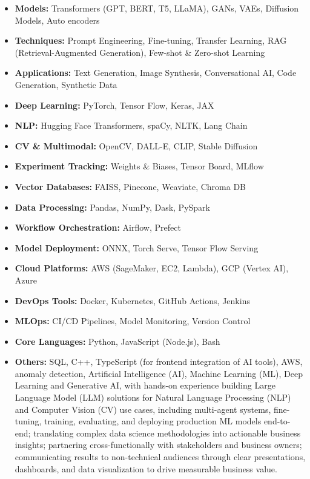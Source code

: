 \documentclass[11pt,letterpaper]{article}
\begin{document}
\begin{itemize}
  \item \textbf{Models:} Transformers (GPT, BERT, T5, LLaMA), GANs, VAEs, Diffusion Models, Auto encoders
  \item \textbf{Techniques:} Prompt Engineering, Fine-tuning, Transfer Learning, RAG (Retrieval-Augmented Generation), Few-shot \& Zero-shot Learning
  \item \textbf{Applications:} Text Generation, Image Synthesis, Conversational AI, Code Generation, Synthetic Data
  \item \textbf{Deep Learning:} PyTorch, Tensor Flow, Keras, JAX
  \item \textbf{NLP:} Hugging Face Transformers, spaCy, NLTK, Lang Chain
  \item \textbf{CV \& Multimodal:} OpenCV, DALL-E, CLIP, Stable Diffusion
  \item \textbf{Experiment Tracking:} Weights \& Biases, Tensor Board, MLflow
  \item \textbf{Vector Databases:} FAISS, Pinecone, Weaviate, Chroma DB
  \item \textbf{Data Processing:} Pandas, NumPy, Dask, PySpark
  \item \textbf{Workflow Orchestration:} Airflow, Prefect
  \item \textbf{Model Deployment:} ONNX, Torch Serve, Tensor Flow Serving
  \item \textbf{Cloud Platforms:} AWS (SageMaker, EC2, Lambda), GCP (Vertex AI), Azure
  \item \textbf{DevOps Tools:} Docker, Kubernetes, GitHub Actions, Jenkins
  \item \textbf{MLOps:} CI/CD Pipelines, Model Monitoring, Version Control
  \item \textbf{Core Languages:} Python, JavaScript (Node.js), Bash
  \item \textbf{Others:} SQL, C++, TypeScript (for frontend integration of AI tools), AWS, anomaly detection,
        Artificial Intelligence (AI), Machine Learning (ML), Deep Learning and Generative AI, with hands-on
        experience building Large Language Model (LLM) solutions for Natural Language Processing (NLP) and
        Computer Vision (CV) use cases, including multi-agent systems, fine-tuning, training, evaluating, and
        deploying production ML models end-to-end; translating complex data science methodologies into
        actionable business insights; partnering cross-functionally with stakeholders and business owners;
        communicating results to non-technical audiences through clear presentations, dashboards, and data
        visualization to drive measurable business value.
\end{itemize}
\end{document}
